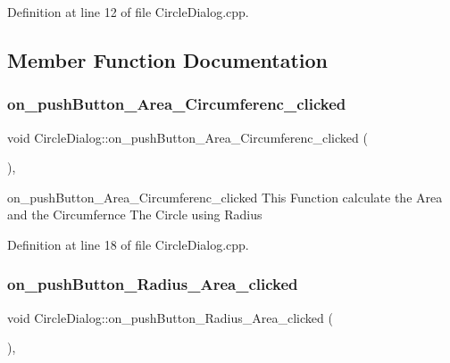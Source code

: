 Definition at line 12 of file Circle\+Dialog.\+cpp.



\subsection{Member Function Documentation}
\mbox{\label{class_circle_dialog_a30ff932eb29dc95c4467ba421b5851a8}} 
\subsubsection{\texorpdfstring{on\+\_\+push\+Button\+\_\+\+Area\+\_\+\+Circumferenc\+\_\+clicked}{on\_pushButton\_Area\_Circumferenc\_clicked}}
{\footnotesize\ttfamily void Circle\+Dialog\+::on\+\_\+push\+Button\+\_\+\+Area\+\_\+\+Circumferenc\+\_\+clicked (\begin{DoxyParamCaption}{ }\end{DoxyParamCaption})\hspace{0.3cm}{\ttfamily [private]}, {\ttfamily [slot]}}



on\+\_\+push\+Button\+\_\+\+Area\+\_\+\+Circumferenc\+\_\+clicked This Function calculate the Area and the Circumfernce The Circle using Radius 



Definition at line 18 of file Circle\+Dialog.\+cpp.

\mbox{\label{class_circle_dialog_ad4190e5db5c4d25be7643053b82e0f76}} 
\subsubsection{\texorpdfstring{on\+\_\+push\+Button\+\_\+\+Radius\+\_\+\+Area\+\_\+clicked}{on\_pushButton\_Radius\_Area\_clicked}}
{\footnotesize\ttfamily void Circle\+Dialog\+::on\+\_\+push\+Button\+\_\+\+Radius\+\_\+\+Area\+\_\+clicked (\begin{DoxyParamCaption}{ }\end{DoxyParamCaption})\hspace{0.3cm}{\ttfamily [private]}, {\ttfamily [slot]}}



